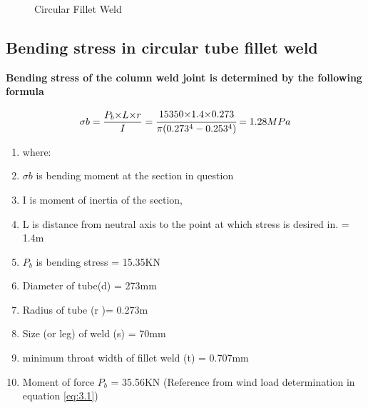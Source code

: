 {\begin{figure}%
    \centering
     \cite{Dannana2021How}
    \qquad
    \cite{doane_2016}
    \caption{Circular Fillet Weld}%
    \label{fig:3.16}%
\end{figure}


\subsection{Bending stress in circular tube fillet weld}



\textbf{Bending stress of the column weld joint is determined by the following formula}

\begin{equation}
\sigma b = \frac{P_b {\times L} {\times r}} {I} = \cfrac{15350 {\times 1.4} {\times 0.273}} {\pi ( 0.273^4 - 0.253^4)} = 1.28MPa
\end{equation}



\begin{enumerate}[label={}]
\item where:
\item \(\sigma b\) is bending moment at the section in question
\item I is moment of inertia of the section,
\item L is distance from neutral axis to the point at which stress is desired in. = 1.4m
\item\({P}_{b}\) is bending stress = 15.35KN
\item  Diameter of tube(d) = 273mm
\item Radius of tube (r )= 0.273m
\item Size (or leg) of weld (s)  = 70mm 
\item  minimum throat width of fillet weld (t) = 0.707mm 
\item Moment of force \(P_b\) = 35.56KN  (Reference from wind load determination in equation \ref{eq:3.1})
\end{enumerate}


}
